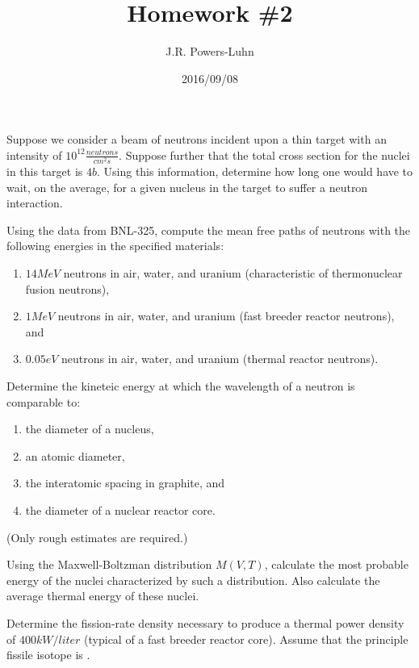 \documentclass{hw}
\author{J.R. Powers-Luhn}
\date{2016/09/08}
\title{Homework \#2}
\begin{document}
	Suppose we consider a beam of neutrons incident upon a thin target with an intensity of $ 10^{12} \frac{neutrons}{cm^2 s} $. Suppose further that the total cross section for the nuclei in this target is $ 4 b $. Using this information, determine how long one would have to wait, on the average, for a given nucleus in the target to suffer a neutron interaction.

\solution


	Using the data from BNL-325, compute the mean free paths of neutrons with the following energies in the specified materials:
	\begin{enumerate}
		\item $ 14 MeV $ neutrons in air, water, and uranium (characteristic of thermonuclear fusion neutrons),
		\item $ 1 MeV $ neutrons in air, water, and uranium (fast breeder reactor neutrons), and
		\item $ 0.05 eV $ neutrons in air, water, and uranium (thermal reactor neutrons).
	\end{enumerate}

\solution


	Determine the kineteic energy at which the wavelength of a neutron is comparable to:
	\begin{enumerate}
		\item the diameter of a nucleus,
		\item an atomic diameter,
		\item the interatomic spacing in graphite, and
		\item the diameter of a nuclear reactor core.
	\end{enumerate}
	(Only rough estimates are required.)

\solution


	Using the Maxwell-Boltzman distribution $ M(V,T) $, calculate the most probable energy of the nuclei characterized by such a distribution. Also calculate the average thermal energy of these nuclei.

\solution


	Determine the fission-rate density necessary to produce a thermal power density of $ 400 kW/liter $ (typical of a fast breeder reactor core). Assume that the principle fissile isotope is .

\solution
\end{document}
